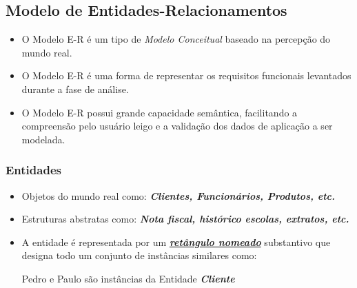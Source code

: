 \documentclass[12pt,a4paper,titlepage]{article}
\begin{document}
\subsection{Modelo de Entidades-Relacionamentos}
\begin{itemize}
    \item O Modelo E-R é um tipo de \textit{Modelo Conceitual} baseado na percepção do mundo real.
    \item O Modelo E-R é uma forma de representar os requisitos funcionais levantados durante a fase de análise.
    \item O Modelo E-R possui grande capacidade semântica, facilitando a compreensão pelo usuário leigo e a validação dos dados de aplicação a ser modelada.
\end{itemize}

\subsubsection{Entidades}
\begin{itemize}
    \item Objetos do mundo real como: \textit{\textbf{Clientes, Funcionários, Produtos, etc.}}
    \item Estruturas abstratas como: \textit{\textbf{Nota fiscal, histórico escolas, extratos, etc.}}
    \item A entidade é representada por um \textbf{\textit{\underline{retângulo nomeado}}} substantivo que designa todo um conjunto de instâncias similares como:\par Pedro e Paulo são instâncias da Entidade \textit{\textbf{Cliente}}
\end{itemize}
\end{document}

